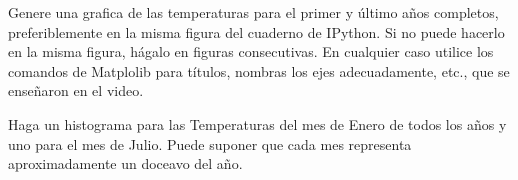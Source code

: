 \documentclass[11pt,letterpaper]{exam}
\begin{document}
\begin{questions}


Genere una grafica de las temperaturas para el primer y último años completos, preferiblemente en la misma figura del cuaderno de IPython. Si no puede hacerlo en la misma figura, hágalo en figuras consecutivas. En cualquier caso utilice los comandos de Matplolib para títulos, nombras los ejes adecuadamente, etc., que se enseñaron en el video.


Haga un histograma para las Temperaturas del mes de Enero de todos los años y uno para el mes de Julio. Puede suponer que cada mes representa aproximadamente un doceavo del año.

\end{questions}
\end{document}
